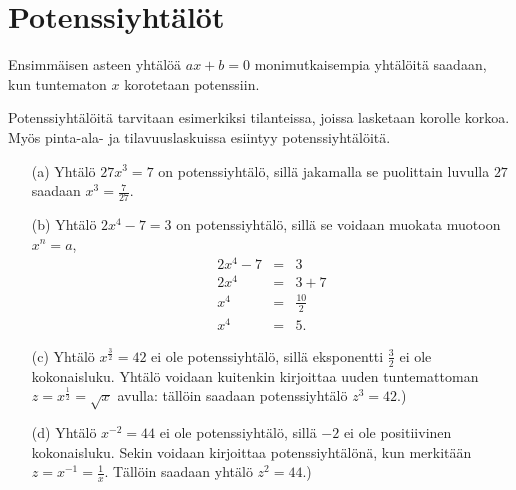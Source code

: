 \section{Potenssiyhtälöt}

Ensimmäisen asteen yhtälöä $ax+b = 0$ monimutkaisempia yhtälöitä saadaan,
kun tuntematon $x$ korotetaan potenssiin.


Potenssiyhtälöitä tarvitaan esimerkiksi tilanteissa, joissa lasketaan
korolle korkoa. Myös pinta-ala- ja tilavuuslaskuissa esiintyy potenssiyhtälöitä.

\begin{esimerkki}
\begin{enumerate}
\item[(a)]
Yhtälö $27x^3=7$ on potenssiyhtälö, sillä jakamalla se
puolittain luvulla $27$ saadaan $x^3 = \frac{7}{27}$.
\item[(b)]
Yhtälö $2x^{4}-7=3$ on potenssiyhtälö, sillä se voidaan muokata
muotoon $x^n = a$,
\begin{eqnarray*}
2x^{4} -7 &=& 3 \\
2x^{4} &=& 3+7 \\
x^{4} &=& \frac{10}{2} \\
x^{4} &=& 5.
\end{eqnarray*}
\item[(c)]
Yhtälö $x^{\frac{3}{2}}=42$ ei ole potenssiyhtälö, sillä eksponentti
$\frac{3}{2}$ ei ole kokonaisluku. Yhtälö voidaan kuitenkin kirjoittaa
uuden tuntemattoman $z=x^{\frac{1}{2}}=\sqrt{x}$ avulla: tällöin
saadaan potenssiyhtälö $z^3 = 42$.)
\item[(d)]
Yhtälö $x^{-2}=44$ ei ole potenssiyhtälö, sillä $-2$ ei ole positiivinen kokonaisluku. Sekin voidaan kirjoittaa potenssiyhtälönä, kun merkitään
$z=x^{-1}=\frac{1}{x}$. Tällöin saadaan yhtälö $z^2 = 44$.)
\end{enumerate}
\end{esimerkki}


